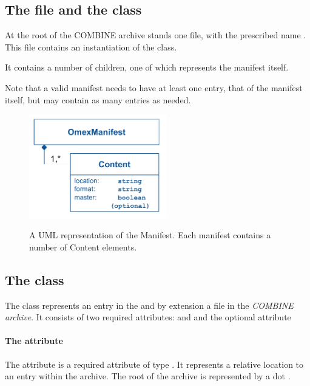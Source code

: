 \newpage
\subsection{The  file and the  class}
\label{manifest-class}

At the root of the COMBINE archive stands one file, with the prescribed name . This file contains an instantiation of the \OmexManifest class. 

It contains a number of \Content children, one of which represents the manifest itself. 

Note that a valid manifest needs to have at least one entry, that of the manifest itself, but may 
contain as many entries as needed. 

\begin{figure}[h!]
  \centering
  \includegraphics[width=6cm]{images/OmexManifest.pdf}\\
  \caption{A UML representation of the Manifest. Each manifest contains a number
	of Content elements.}
  \label{fig:combine_uml}
\end{figure}

\subsection{The  class}
\label{content-class}
The \Content class represents an entry in the \OmexManifest and by 
extension a file in the \textit{COMBINE archive}. It consists of two 
required attributes:  and  and the 
optional attribute  

\paragraph{The  attribute}
The  attribute is a required attribute of type 
. It represents a relative location to an entry within the 
archive. The root of the archive is represented by a dot . 

